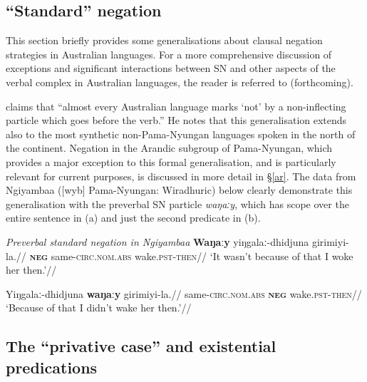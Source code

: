 \documentclass[usenames,dvipsnames,11pt]{article}
\begin{document}
{\subsection{``Standard'' negation}
This section briefly provides some generalisations about clausal negation strategies in Australian languages. For a more comprehensive discussion of exceptions and significant interactions between SN and other aspects of the verbal complex in Australian languages, the reader is referred to \citeauthor{PhillipsFCb} (forthcoming).

\citet[82]{Dixon2002a} claims that ``almost every Australian language marks `not' by a non-inflecting particle which goes before the verb.'' He notes that this generalisation extends also to the most synthetic non-Pama-Nyungan languages spoken in the north of the continent. Negation in the Arandic subgroup of Pama-Nyungan, which provides a major exception to this formal generalisation, and is particularly relevant for current purposes, is discussed in more detail in §\ref{ar}. The data from Ngiyambaa ([\gls{wyb}] Pama-Nyungan: Wiradhuric) below clearly demonstrate this generalisation with the preverbal SN particle \textit{waŋaːy}, which has scope over the entire sentence in (a) and just the second predicate in (b).

\pex\label{sn-wyb}\textit{ Preverbal standard negation in Ngiyambaa}
\a\label{wyb1}\begingl\gla \textbf{Waŋaːy} yiŋgalaː-dhi\textdblhyphen dju\textdblhyphen na girimiyi-la.//
\glb \textsc{\textbf{neg}} same-\textsc{circ}.\textsc{nom}.\textsc{abs} wake\textsc{.pst-then}//
\glft`It wasn't because of that I woke her then.'//\endgl

\a\label{wyb2}\begingl\gla Yiŋgalaː-dhi\textdblhyphen dju\textdblhyphen na \textbf{waŋaːy} girimiyi-la.//
\glb same-\textsc{circ}.\textsc{nom}.\textsc{abs} \textsc{\textbf{neg}} wake\textsc{.pst-then}//
\glft`Because of that I didn't wake her then.'//\endgl
\xe
\subsection{The ``privative case'' and existential predications}\label{priv-sems}

}
\end{document}
